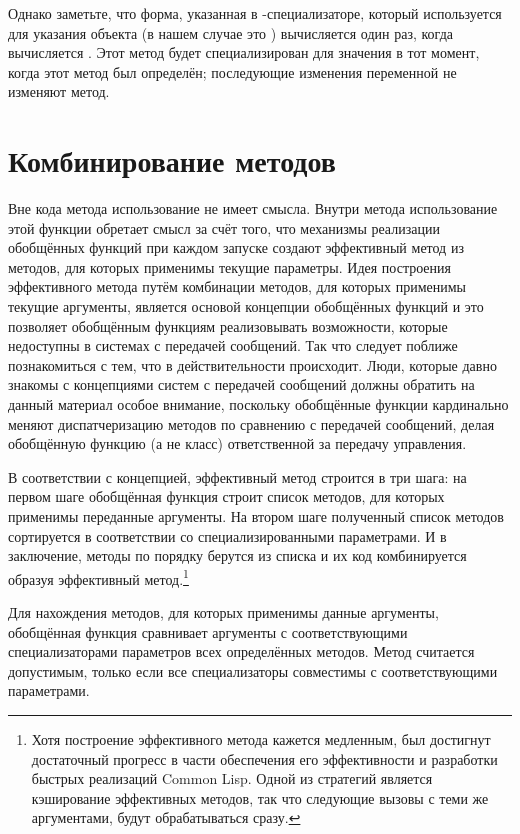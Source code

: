 Однако заметьте, что форма, указанная в -специализаторе, который используется
для указания объекта (в нашем случае это ) вычисляется
один раз, когда вычисляется .  Этот метод будет специализирован для
значения  в тот момент, когда этот метод был определён;
последующие изменения переменной не изменяют метод.

\section{Комбинирование методов}

Вне кода метода использование  не имеет смысла.  Внутри метода
использование этой функции обретает смысл за счёт того, что механизмы реализации
обобщённых функций при каждом запуске создают эффективный метод из методов, для которых
применимы текущие параметры.  Идея построения эффективного метода путём комбинации
методов, для которых применимы текущие аргументы, является основой концепции обобщённых
функций и это позволяет обобщённым функциям реализовывать возможности, которые недоступны
в системах с передачей сообщений.  Так что следует поближе познакомиться с тем, что в
действительности происходит.  Люди, которые давно знакомы с концепциями систем с передачей
сообщений должны обратить на данный материал особое внимание, поскольку обобщённые функции
кардинально меняют диспатчеризацию методов по сравнению с передачей сообщений, делая
обобщённую функцию (а не класс) ответственной за передачу управления.

В соответствии с концепцией, эффективный метод строится в три шага: на первом шаге
обобщённая функция строит список методов, для которых применимы переданные аргументы.  На
втором шаге полученный список методов сортируется в соответствии со специализированными
параметрами.  И в заключение, методы по порядку берутся из списка и их код комбинируется
образуя эффективный метод.\footnote{Хотя построение эффективного метода кажется медленным,
  был достигнут достаточный прогресс в части обеспечения его эффективности и разработки
  быстрых реализаций Common Lisp.  Одной из стратегий является кэширование эффективных
  методов, так что следующие вызовы с теми же аргументами, будут обрабатываться сразу.}

Для нахождения методов, для которых применимы данные аргументы, обобщённая функция
сравнивает аргументы с соответствующими специализаторами параметров всех определённых
методов.  Метод считается допустимым, только если все специализаторы совместимы с
соответствующими параметрами.

